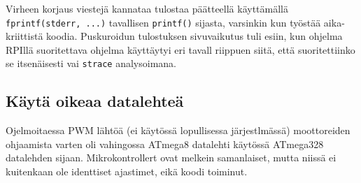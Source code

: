 \documentclass[]{article} %
\numberwithin{equation}{section}
\numberwithin{figure}{section}
\numberwithin{table}{section}
\begin{document}
Virheen korjaus viestejä kannataa tulostaa päätteellä käyttämällä \verb+fprintf(stderr, ...)+ tavallisen \verb+printf()+ sijasta, varsinkin kun työstää aika-kriittistä koodia. Puskuroidun tulostuksen sivuvaikutus tuli esiin, kun ohjelma RPIllä suoritettava ohjelma käyttäytyi eri tavall riippuen siitä, että suoritettiinko se itsenäisesti vai \verb+strace+ analysoimana. 

  
\subsection{Käytä oikeaa datalehteä}
\label{sub:Kayta oikeaa datalehtea}


Ojelmoitaessa PWM lähtöä (ei käytössä lopullisessa järjestlmässä) moottoreiden ohjaamista varten oli vahingossa ATmega8 datalehti käytössä ATmega328 datalehden sijaan. Mikrokontrollert ovat melkein samanlaiset, mutta niissä ei kuitenkaan ole identtiset ajastimet, eikä koodi toiminut. 
\end{document}
